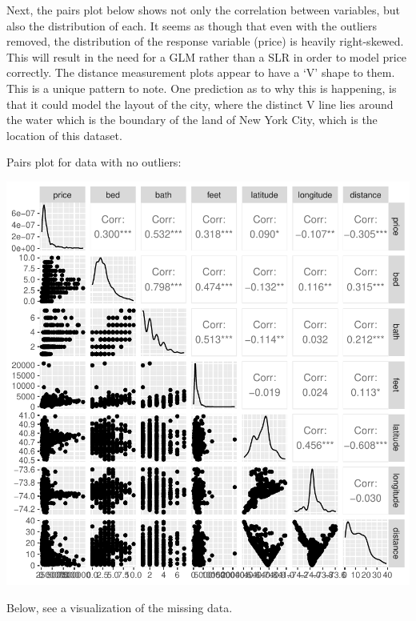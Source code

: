 \documentclass[11pt, a4paper]{article}
\begin{document}
Next, the pairs plot below shows not only the correlation between variables, but also the distribution of each. It seems as though that even with the outliers removed, the distribution of the response variable (price) is heavily right-skewed. This will result in the need for a GLM rather than a SLR in order to model price correctly. The distance measurement plots appear to have a `V' shape to them. This is a unique pattern to note. One prediction as to why this is happening, is that it could model the layout of the city, where the distinct V line lies around the water which is the boundary of the land of New York City, which is the location of this dataset.

\begin{Schunk}
\begin{Soutput}
Pairs plot for data with no outliers:
\end{Soutput}
\end{Schunk}
\includegraphics{exploratory_analysis-004}

Below, see a visualization of the missing data. 
\end{document}
